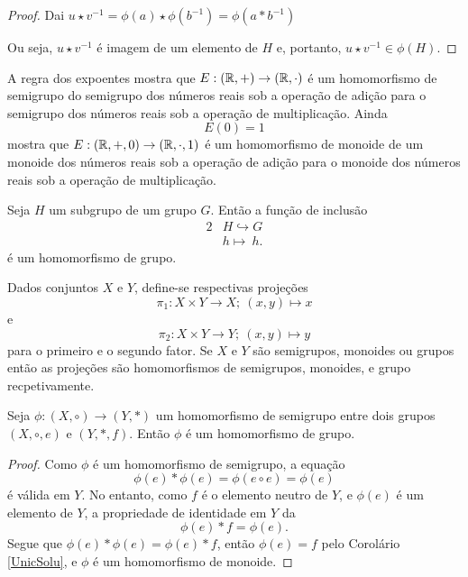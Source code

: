 \begin{definition}[Magma]
\begin{exmp}
\begin{proof}
               Dai $u \star v^{-1} = \phi(a) \star \phi(b^{-1}) = \phi(a * b^{-1})$

               Ou seja, $u \star v^{-1}$ é imagem de um elemento de $H$ e, portanto, $u \star v^{-1} \in \phi(H)$.
            \end{proof}
         \end{exmp}

         \begin{exmp}
            A regra dos expoentes mostra que $E: (\mathbb{R}, +) \to (\mathbb{R},\cdot)$ é um homomorfismo de semigrupo do semigrupo dos números reais sob a operação de adição para o semigrupo dos números reais sob a operação de multiplicação. Ainda $$E(0)=1$$ mostra que $E: (\mathbb{R},+,0) \to (\mathbb{R},\cdot,1)$ é um homomorfismo de monoide de um monoide dos números reais sob a operação de adição para o monoide dos números reais sob a operação de multiplicação.
         \end{exmp}
         \begin{exmp}
            Seja $H$ um subgrupo de um grupo $G$. Então a função de inclusão
            \begin{alignat}{2}
               &H \hookrightarrow G \nonumber\\
               &h \mapsto\ h.
               \nonumber
            \end{alignat}
            é um homomorfismo de grupo.
         \end{exmp}
         \begin{exmp}
            Dados conjuntos $X$ e $Y$, define-se respectivas projeções
            $$\pi_{1}: X\times Y \to X;\ (x,y)\mapsto x$$ e $$\pi_{2}: X\times Y \to Y;\ (x,y)\mapsto y$$
            para o primeiro e o segundo fator. Se $X$ e $Y$ são semigrupos, monoides ou grupos então as projeções são homomorfismos de semigrupos, monoides, e grupo recpetivamente.
         \end{exmp}

         \begin{stat}
            Seja $\phi: (X,\circ) \to (Y,*)$ um homomorfismo de semigrupo entre dois grupos $(X,\circ,e)$ e $(Y,*,f)$. Então $\phi$ é um homomorfismo de grupo.
            \begin{proof}
               Como $\phi$ é um homomorfismo de semigrupo, a equação
               $$\phi(e)*\phi(e) = \phi(e\circ e)=\phi(e)$$
               é válida em $Y$. No entanto, como $f$ é o elemento neutro de $Y$, e $\phi(e)$ é um elemento de $Y$, a propriedade de identidade em $Y$ da $$\phi(e)*f=\phi(e).$$
               Segue que $\phi(e)*\phi(e)=\phi(e)*f$, então $\phi(e) =f$ pelo Corolário \ref{UnicSolu}, e $\phi$ é um homomorfismo de monoide.


\end{proof}
\end{stat}
\end{definition}
